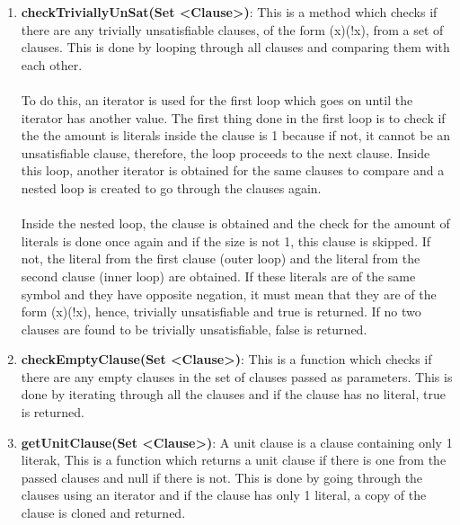 \documentclass{article}
\begin{document}
\begin{enumerate}
		\item \textbf{checkTriviallyUnSat(Set \textless Clause\textgreater)}: This is a method which checks if there are any trivially unsatisfiable clauses, of the form (x)(!x), from a set of clauses. This is done by looping through all clauses and comparing them with each other.\\\\
		To do this, an iterator is used for the first loop which goes on until the iterator has another value. The first thing done in the first loop is to check if the the amount is literals inside the clause is 1 because if not, it cannot be an unsatisfiable clause, therefore, the loop proceeds to the next clause. Inside this loop, another iterator is obtained for the same clauses to compare and a nested loop is created to go through the clauses again.\\\\
		Inside the nested loop, the clause is obtained and the check for the amount of literals is done once again and if the size is not 1, this clause is skipped. If not, the literal from the first clause (outer loop) and the literal from the second clause (inner loop) are obtained. If these literals are of the same symbol and they have opposite negation, it must mean that they are of the form (x)(!x), hence, trivially unsatisfiable and true is returned. If no two clauses are found to be trivially unsatisfiable, false is returned.
		
		\item \textbf{checkEmptyClause(Set \textless Clause\textgreater)}: This is a function which checks if there are any empty clauses in the set of clauses passed as parameters. This is done by iterating through all the clauses and if the clause has no literal, true is returned.
		
		\item \textbf{getUnitClause(Set \textless Clause\textgreater)}: A unit clause is a clause containing only 1 literak, This is a function which returns a unit clause if there is one from the passed clauses and null if there is not. This is done by going through the clauses using an iterator and if the clause has only 1 literal, a copy of the clause is cloned and returned.
		

\end{enumerate}
\end{document}
